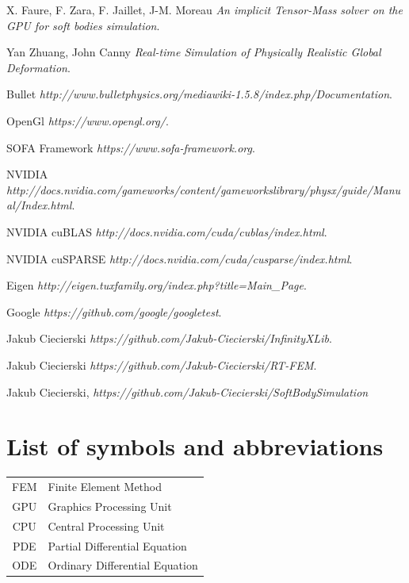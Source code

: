 \documentclass[en]{minipw} %
\begin{document}
\begin{thebibliography}{25}
 X. Faure, F. Zara, F. Jaillet, J-M. Moreau  \emph{An implicit Tensor-Mass solver on the GPU for soft bodies simulation}.

 Yan Zhuang, John Canny \emph{Real-time Simulation of Physically Realistic Global Deformation}.


 Bullet \emph{http://www.bulletphysics.org/mediawiki-1.5.8/index.php/Documentation}.

 OpenGl \emph{https://www.opengl.org/}.

 SOFA Framework \emph{https://www.sofa-framework.org}.

 NVIDIA \emph{http://docs.nvidia.com/gameworks/content/gameworkslibrary/physx/guide/Manual/Index.html}.

 NVIDIA cuBLAS \emph{http://docs.nvidia.com/cuda/cublas/index.html}.

 NVIDIA cuSPARSE \emph{http://docs.nvidia.com/cuda/cusparse/index.html}.

 Eigen \emph{http://eigen.tuxfamily.org/index.php?title=Main\_Page}.

 Google \emph{https://github.com/google/googletest}.


 Jakub Ciecierski \emph{https://github.com/Jakub-Ciecierski/InfinityXLib}.

 Jakub Ciecierski \emph{https://github.com/Jakub-Ciecierski/RT-FEM}.

 Jakub Ciecierski, \emph{https://github.com/Jakub-Ciecierski/SoftBodySimulation}


\end{thebibliography}

\chapter*{List of symbols and abbreviations}

\begin{tabular}{cl}
FEM & Finite Element Method \\
GPU & Graphics Processing Unit \\
CPU & Central Processing Unit \\
PDE & Partial Differential Equation \\
ODE & Ordinary Differential Equation \\
\end{tabular}
\end{document}
